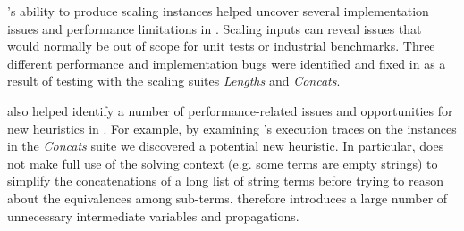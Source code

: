 \fuzzer{}'s ability to produce scaling instances helped uncover several
implementation issues and performance limitations in \us{}. Scaling inputs
can reveal issues that would normally be out of scope for unit tests or
industrial benchmarks. Three different
performance and implementation bugs were identified and fixed in \us{}
as a result of testing with the \fuzzer{} scaling suites
\textit{Lengths} and \textit{Concats}.

\fuzzer also helped identify a number of performance-related issues and opportunities for
new heuristics in \us{}. For example, by examining \us{}'s execution traces on the
instances in the \textit{Concats} suite we discovered a
potential new heuristic. In particular, \us{} does not
make full use of the solving context (e.g. some terms are empty
strings) to simplify the concatenations of a long list of string terms
before trying to reason about the equivalences among sub-terms. \us{}
therefore introduces a large number of unnecessary intermediate
variables and propagations.
